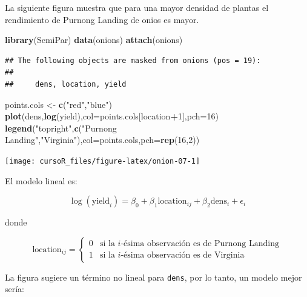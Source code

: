 \documentclass[]{book}
\newenvironment{Shaded}{\begin{snugshade}}{\end{snugshade}}
\newcommand{\KeywordTok}[1]{\textcolor[rgb]{0.13,0.29,0.53}{\textbf{#1}}}
\newcommand{\DataTypeTok}[1]{\textcolor[rgb]{0.13,0.29,0.53}{#1}}
\newcommand{\DecValTok}[1]{\textcolor[rgb]{0.00,0.00,0.81}{#1}}
\newcommand{\StringTok}[1]{\textcolor[rgb]{0.31,0.60,0.02}{#1}}
\newcommand{\OperatorTok}[1]{\textcolor[rgb]{0.81,0.36,0.00}{\textbf{#1}}}
\newcommand{\NormalTok}[1]{#1}
\begin{document}
La siguiente figura muestra que para una mayor densidad de plantas el
rendimiento de Purnong Landing de onios es mayor.

\begin{Shaded}
\begin{Highlighting}[]
\KeywordTok{library}\NormalTok{(SemiPar)}
\KeywordTok{data}\NormalTok{(onions)}
\KeywordTok{attach}\NormalTok{(onions)}
\end{Highlighting}
\end{Shaded}

\begin{verbatim}
## The following objects are masked from onions (pos = 19):
## 
##     dens, location, yield
\end{verbatim}

\begin{Shaded}
\begin{Highlighting}[]
\NormalTok{points.cols <-}\StringTok{ }\KeywordTok{c}\NormalTok{(}\StringTok{"red"}\NormalTok{,}\StringTok{"blue"}\NormalTok{)}
\KeywordTok{plot}\NormalTok{(dens,}\KeywordTok{log}\NormalTok{(yield),}\DataTypeTok{col=}\NormalTok{points.cols[location}\OperatorTok{+}\DecValTok{1}\NormalTok{],}\DataTypeTok{pch=}\DecValTok{16}\NormalTok{)}
\KeywordTok{legend}\NormalTok{(}\StringTok{"topright"}\NormalTok{,}\KeywordTok{c}\NormalTok{(}\StringTok{"Purnong Landing"}\NormalTok{,}\StringTok{"Virginia"}\NormalTok{),}\DataTypeTok{col=}\NormalTok{points.cols,}\DataTypeTok{pch=}\KeywordTok{rep}\NormalTok{(}\DecValTok{16}\NormalTok{,}\DecValTok{2}\NormalTok{))}
\end{Highlighting}
\end{Shaded}

\begin{center}\texttt{[image: cursoR\_files/figure-latex/onion-07-1]} \end{center}

El modelo lineal es:

\[
\log(\text{yield}_i) = \beta_0 + \beta_1\text{location}_{ij} + \beta_2 \text{dens}_i + \epsilon_i
\]

donde

\[
\text{location}_{ij} =
\left\{
\begin{array}{cl}
0 & \mbox{si la $i$-ésima observación es de Purnong Landing} \\
1 & \mbox{si la $i$-ésima observación es de Virginia}
\end{array}
\right.
\]

La figura sugiere un término no lineal para \texttt{dens}, por lo tanto,
un modelo mejor sería:
\end{document}

